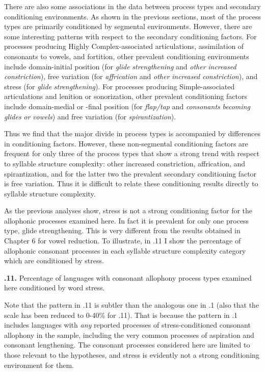   There are also some associations in the data between process types and secondary conditioning environments. As shown in the previous sections, most of the process types are primarily conditioned by segmental environments. However, there are some interesting patterns with respect to the secondary conditioning factors. For processes producing Highly Complex-associated articulations, assimilation of consonants to vowels, and fortition, other prevalent conditioning environments include domain-initial position (for \textit{glide} \textit{strengthening} and \textit{other} \textit{increased} \textit{constriction}), free variation (for \textit{affrication} and \textit{other} \textit{increased} \textit{constriction}), and stress (for \textit{glide} \textit{strengthening}). For processes producing Simple-associated articulations and lenition or sonorization, other prevalent conditioning factors include domain-medial or -final position (for \textit{flap/tap} and \textit{consonants} \textit{becoming} \textit{glides} \textit{or} \textit{vowels}) and free variation (for \textit{spirantization}). 



  Thus we find that the major divide in process types is accompanied by differences in conditioning factors. However, these non-segmental conditioning factors are frequent for only three of the process types that show a strong trend with respect to syllable structure complexity: other increased constriction, affrication, and spirantization, and for the latter two the prevalent secondary conditioning factor is free variation. Thus it is difficult to relate these conditioning results directly to syllable structure complexity.



  As the previous analyses show, stress is not a strong conditioning factor for the allophonic processes examined here. In fact it is prevalent for only one process type, glide strengthening. This is very different from the results obtained in Chapter 6 for vowel reduction. To illustrate, in .11 I show the percentage of allophonic consonant processes in each syllable structure complexity category which are conditioned by stress.





\textbf{.11.} Percentage of languages with consonant allophony process types examined here conditioned by word stress.



  Note that the pattern in .11 is subtler than the analogous one in .1 (also that the scale has been reduced to 0-40\% for .11). That is because the pattern in .1 includes languages with \textit{any} reported processes of stress-conditioned consonant allophony in the sample, including the very common processes of aspiration and consonant lengthening. The consonant processes considered here are limited to those relevant to the hypotheses, and stress is evidently not a strong conditioning environment for them.



